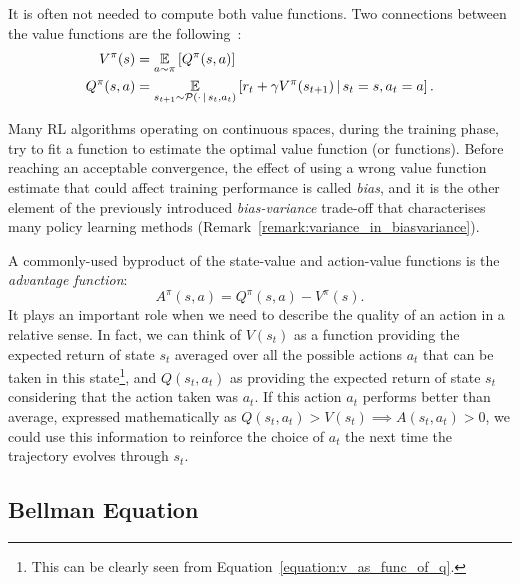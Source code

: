 It is often not needed to compute both value functions.
Two connections between the value functions are the following~\parencite{sutton_reinforcement_2018}:
%
\begin{align}
    V^\pi(s) &= \operatorname*{\mathbb{E}}_{a \sim \pi} \left[ Q^\pi(s, a) \right] \label{equation:v_as_func_of_q}\\
    Q^\pi(s, a) &= \operatorname*{\mathbb{E}}_{s_{t+1} \sim \mathcal{P}(\cdot \operatorname{\mid} s_t, a_t)} \left[ r_t + \gamma V^\pi(s_{t+1}) \operatorname{\mid} s_t=s, a_t=a \right] \label{equation:q_as_func_of_v}
    .
\end{align}

\begin{remark*}
\label{remark:bias_in_biasvariance}
%
Many \ac{RL} algorithms operating on continuous spaces, during the training phase, try to fit a function to estimate the optimal value function (or functions).
Before reaching an acceptable convergence, the effect of using a wrong value function estimate that could affect training performance is called \emph{bias}, and it is the other element of the previously introduced \emph{bias-variance} trade-off that characterises many policy learning methods (Remark~\ref{remark:variance_in_biasvariance}).
%
\end{remark*}

A commonly-used byproduct of the state-value and action-value functions is the \emph{advantage function}:
%
\begin{equation}
    \label{equation:advantage_function}
    A^\pi(s, a) = Q^\pi(s, a) - V^\pi(s) .
\end{equation}
%
It plays an important role when we need to describe the quality of an action in a relative sense.
In fact, we can think of $V(s_t)$ as a function providing the expected return of state $s_t$ averaged over all the possible actions $a_t$ that can be taken in this state\footnote{This can be clearly seen from Equation~\eqref{equation:v_as_func_of_q}.}, and $Q(s_t, a_t)$ as providing the expected return of state $s_t$ considering that the action taken was $a_t$.
If this action $a_t$ performs better than average, expressed mathematically as $Q(s_t, a_t) > V(s_t) \implies A(s_t, a_t) > 0$, we could use this information to reinforce the choice of $a_t$ the next time the trajectory evolves through $s_t$.

\subsection{Bellman Equation}
\label{section:bellman_equation}

